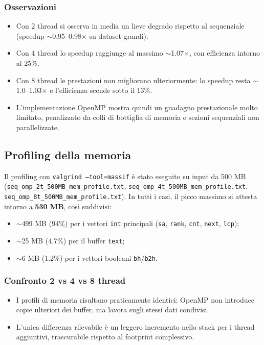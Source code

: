 			\subsubsection*{Osservazioni}
				\begin{itemize}
						\item Con 2 thread si osserva in media un lieve degrado rispetto al sequenziale (speedup $\sim$0.95--0.98$\times$ su dataset grandi).
						\item Con 4 thread lo speedup raggiunge al massimo $\sim$1.07$\times$, con efficienza intorno al 25\%.
						\item Con 8 thread le prestazioni non migliorano ulteriormente: lo speedup resta $\sim$1.0--1.03$\times$ e l’efficienza scende sotto il 13\%.
						\item L’implementazione OpenMP mostra quindi un guadagno prestazionale molto limitato, penalizzato da colli di bottiglia di memoria e sezioni sequenziali non parallelizzate.
				\end{itemize}
		
		\subsection{Profiling della memoria}
			Il profiling con \texttt{valgrind --tool=massif} è stato eseguito su input da 500 MB (\texttt{seq\_omp\_2t\_500MB\_mem\_profile.txt}, \texttt{seq\_omp\_4t\_500MB\_mem\_profile.txt}, \texttt{seq\_omp\_8t\_500MB\_mem\_profile.txt}).
			In tutti i casi, il picco massimo si attesta intorno a \textbf{530 MB}, così suddivisi:
			\begin{itemize}
				\item $\sim$499 MB (94\%) per i vettori \texttt{int} principali (\texttt{sa}, \texttt{rank}, \texttt{cnt}, \texttt{next}, \texttt{lcp});
				\item $\sim$25 MB (4.7\%) per il buffer \texttt{text};
				\item $\sim$6 MB (1.2\%) per i vettori booleani \texttt{bh}/\texttt{b2h}.
			\end{itemize}
			
			\subsubsection*{Confronto 2 vs 4 vs 8 thread}
				\begin{itemize}
						\item I profili di memoria risultano praticamente identici: OpenMP non introduce copie ulteriori dei buffer, ma lavora sugli stessi dati condivisi.
						\item L’unica differenza rilevabile è un leggero incremento nello stack per i thread aggiuntivi, trascurabile rispetto al footprint complessivo.
				\end{itemize}
				
